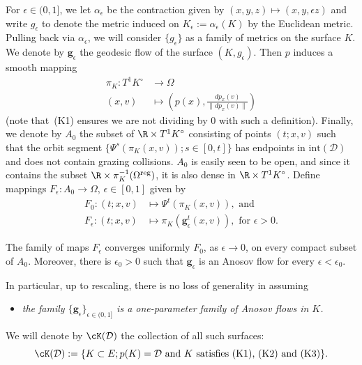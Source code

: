 \documentclass[reqno,11pt]{amsart}
\begin{document}
\par For \( \epsilon \in (0,1] \), we let \( \alpha_\epsilon \) be the contraction given by \( (x,y,z) \mapsto (x, y, \epsilon z) \) and write \( g_\epsilon \) to denote the metric induced on \( K_\epsilon := \alpha_\epsilon(K) \) by the Euclidean metric.
Pulling back via \( \alpha_\epsilon \), we will consider \( \{g_\epsilon\} \) as a family of metrics on the surface \( K \). 
We denote by \( \mathbf{g}_\epsilon \) the geodesic flow of the surface \( (K, g_\epsilon) \).
Then \( p \) induces a smooth mapping
\begin{equation}\label{eq:projection_flow_equivalence}
\begin{split}
    \pi_K\colon T^1K^\circ &\to\Omega \\
    (x,v) &\mapsto \left(p(x), \frac{dp_x(v)}{\|dp_x(v)\|}\right)
\end{split}
\end{equation}
(note that~(K1) ensures we are not dividing by \( 0 \) with such a definition).
Finally, we denote by \( A_0 \) the subset of \( \R \times T^1K^\circ \) consisting of points \( (t; x,v) \) such that the orbit segment \( \{\Psi^s(\pi_K(x,v)); s \in [0,t]\} \) has endpoints in \( \mathrm{int}(\mathcal{D}) \) and does not contain grazing collisions. 
\(A_0\) is easily seen to be open, and since it contains the subset \(\R \times \pi_K^{-1}(\Omega^\mathrm{reg})\), it is also dense in \(\R \times T^1K^\circ\).
Define mappings \( F_\epsilon\colon A_0 \to \Omega \), \( \epsilon \in [0,1] \) given by
\begin{align*}
    F_0\colon (t; x,v) &\mapsto \Psi^t(\pi_K(x,v)), \text{ and} \\
    F_\epsilon\colon (t; x,v) &\mapsto \pi_K(\mathbf{g}^t_\epsilon(x,v)), \text{ for } \epsilon > 0.
\end{align*}
\begin{theorem}\label{thm:kourganoff_approximation}
    The family of maps \( F_\epsilon \) converges uniformly \( F_0 \), as \( \epsilon \to 0 \), on every compact subset of \( A_0 \).
    Moreover, there is \( \epsilon_0 > 0 \) such that \( \mathbf{g}_\epsilon \) is an Anosov flow for every \( \epsilon < \epsilon_0 \).
\end{theorem}
In particular, up to rescaling, there is no loss of generality in assuming
\begin{itemize}
    \item[(K3)] \emph{
        the family \( \{\mathbf{g}_\epsilon\}_{\epsilon \in (0,1]} \) is a one-parameter family of Anosov flows in \( K \).
        }
\end{itemize}
We will denote by \( \cK(\mathcal{D}) \) the collection of all such surfaces:
\[
    \cK(\mathcal{D}) := \{K \subset E; p(K) = \mathcal{D} \text{ and } K \text{ satisfies (K1), (K2) and (K3)} \}.
\]
\end{document}
